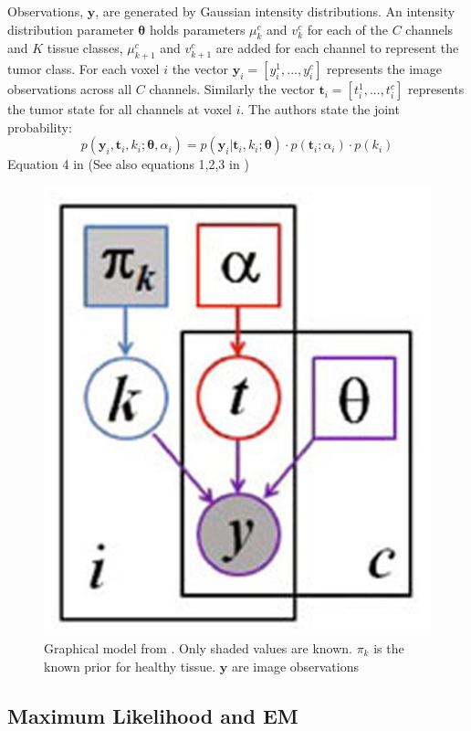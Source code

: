 \documentclass[10pt,twocolumn,letterpaper]{article}
\begin{document}
Observations, $\textbf{y}$, are generated by Gaussian intensity distributions.
An intensity distribution parameter $\boldsymbol{\theta}$ holds parameters $\mu_k^c$ and $v_k^c$ for each of the $C$ channels and $K$ tissue classes, $\mu_{k+1}^c$ and $v_{k+1}^c$ are added for each channel to represent the tumor class. For each voxel $i$ the vector $\textbf{y}_i=[y_i^1,...,y_i^c]$ represents the image observations across all $C$ channels. Similarly the vector $\textbf{t}_i=[t_i^1,...,t_i^c]$ represents the tumor state for all channels at voxel $i$. The authors state the joint probability:
\begin{equation}
p(\textbf{y}_i, \textbf{t}_i, k_i;\boldsymbol{\theta}, \alpha_i) = p(\textbf{y}_i| \textbf{t}_i, k_i;\boldsymbol{\theta})\cdot p(\textbf{t}_i;\alpha_i)\cdot p(k_i)
\end{equation}
Equation 4 in \cite{Menze2010}(See also equations 1,2,3 in \cite{Menze2010}) 

\begin{figure}[t]
	\begin{center}
		\includegraphics[width=0.5\linewidth]{images/model.jpg}
	\end{center}
	\caption{Graphical model from \cite{Menze2010}. Only shaded values are known. $\pi_k$ is the known prior for healthy tissue. $\textbf{y}$ are image observations}
	\label{fig:model}
\end{figure}

\subsection{Maximum Likelihood and EM}
\end{document}
